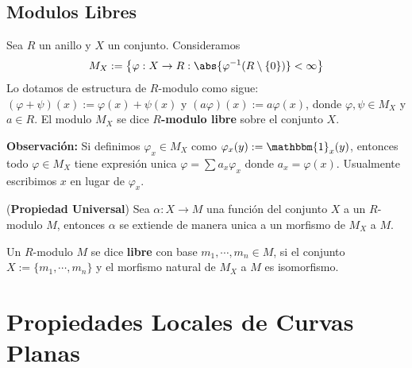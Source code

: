 \documentclass{article}
\begin{document}
\subsection{Modulos Libres}
\begin{dfn}
    Sea $R$ un anillo y $X$ un conjunto. Consideramos
    \begin{equation*}
        M_{X}:=\left\{\varphi:X\to R:\abs{\varphi^{-1}(R\setminus\{0\})}<\infty\right\}
    \end{equation*}
    Lo dotamos de estructura de $R$-modulo como sigue: $(\varphi+\psi)(x):=\varphi(x)+\psi(x)$ y
    $(a\varphi)(x):=a\varphi(x)$, donde $\varphi,\psi\in M_{X}$ y $a\in R$. El modulo $M_{X}$ se
    dice \textbf{$R$-modulo libre} sobre el conjunto $X$.
\end{dfn}
\noindent\textbf{Observación:} Si definimos $\varphi_{x}\in M_{X}$ como 
$\varphi_{x}(y):=\mathbbm{1}_{x}(y)$, entonces todo $\varphi\in M_{X}$ tiene expresión unica
$\varphi=\sum a_{x}\varphi_{x}$ donde $a_{x}=\varphi(x)$. Usualmente escribimos $x$ en lugar de 
$\varphi_{x}$.
\begin{prop}
    (\textbf{Propiedad Universal}) Sea $\alpha:X\to M$ una función del conjunto $X$ a un $R$-modulo
    $M$, entonces $\alpha$ se extiende de manera unica a un morfismo de $M_{X}$ a $M$.
\end{prop}
\begin{dfn}
    Un $R$-modulo $M$ se dice \textbf{libre} con base $m_{1},\cdots,m_{n}\in M$, si el conjunto
    $X:=\{m_{1},\cdots,m_{n}\}$ y el morfismo natural de $M_{X}$ a $M$ es isomorfismo.
\end{dfn}

\newpage
\section{Propiedades Locales de Curvas Planas}

\end{document}
